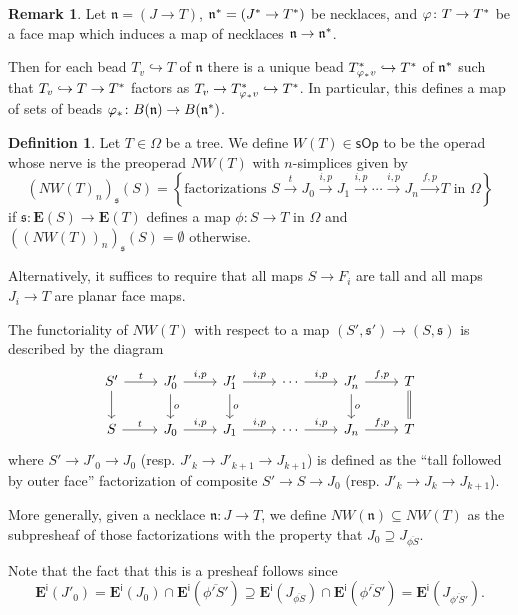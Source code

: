 \documentclass[a4paper,10pt
,draft
]{article}%
\numberwithin{equation}{section}
\numberwithin{figure}{section}
\theoremstyle{definition} %
\newtheorem{definition}[equation]{Definition}%
\newtheorem{remark}[equation]{Remark}%
\newcommand{\1}{\ensuremath{\mathbbm 1}}%
\begin{document}
\begin{remark}\label{BEADMAP REM}
	Let $\mathfrak{n} = (J \to T)$,
	$\mathfrak{n}^{\**} = (J^{\**} \to T^{\**})$
	be necklaces,
	and $\varphi \colon T \to T^{\**}$
	be a face map which induces a map of necklaces
	$\mathfrak{n} \to \mathfrak{n}^{\**}$.

	Then for each bead $T_{v} \hookrightarrow T$
	of $\mathfrak{n}$
	there is a unique bead
	$T^{\**}_{\varphi_{\**} v} \hookrightarrow T^{\**}$
	of $\mathfrak{n}^{\**}$
	such that
	$T_v \hookrightarrow T \to T^{\**}$
	factors as
	$T_v \to T^{\**}_{\varphi_{\**}v} \hookrightarrow T^{\**}$.
%	
	In particular, 
	this defines a map of sets of beads
	$\varphi_{\**} \colon 
	B(\mathfrak{n}) \to B(\mathfrak{n}^{\**})$.
\end{remark}



\begin{definition}\label{NWTNS DEF}
	Let $T \in \Omega$ be a tree.
	We define 
	$W(T) \in \mathsf{sOp}$
	to be the operad whose nerve is the preoperad
	$NW(T)$ with $n$-simplices given by
\[
	\left(NW(T)_n\right)_{\mathfrak{s}}(S)
=
	\left\{
	\text{factorizations }
	S \xrightarrow{t} 
	J_0 \xrightarrow{i,p} 
	J_1 \xrightarrow{i,p} 
	\cdots \xrightarrow{i,p}
	J_n \xrightarrow{f,p}
	T
	\text{ in $\Omega$}
	\right\}
\]
	if $\mathfrak{s} \colon \boldsymbol{E}(S) \to \boldsymbol{E}(T)$
	defines a map $\phi \colon S \to T$ in $\Omega$
	and
	$\left(\left(NW(T)\right)_n\right)_{\mathfrak{s}}(S) = \emptyset$
	otherwise.
	
	Alternatively, it suffices to require that all maps
	$S \to F_i$ are tall
	and all maps $J_i \to T$ are planar face maps.

	
	The functoriality of 
	$NW(T)$
	with respect to a map $(S', \mathfrak s') \to ({S},\mathfrak{s})$
	is described by the diagram
\[
\begin{tikzcd}
	S' \ar{r}{t} \ar{d}
&
	J'_0 \ar{r}{i,p} \ar{d}{o}
&
	J'_1 \ar{r}{i,p} \ar{d}{o}
&
	\cdots \ar{r}{i,p}
&
	J'_n \ar{r}{f,p} \ar{d}{o}
&
	T \ar[equal]{d}
\\
	S \ar{r}{t} 
&
	J_0 \ar{r}{i,p}
&
	J_1 \ar{r}{i,p}
&
	\cdots \ar{r}{i,p}
&
	J_n \ar{r}{f,p}
&
	T	
\end{tikzcd}
\]
	where 
	$S' \to J'_0 \to J_0$
	(resp. $J'_k \to J'_{k+1} \to J_{k+1}$)
	is defined as the ``tall followed by outer face''
	factorization of composite
	$S' \to S \to J_0$
	(resp. $J'_k \to J_{k} \to J_{k+1}$).

	More generally, 
	given a necklace $\mathfrak{n}\colon J \to T$,
	we define
	$NW(\mathfrak{n}) \subseteq NW(T)$
	as the subpresheaf
	of those factorizations with the property that
	$J_0 \supseteq J_{\overline{\phi S}}$.

	Note that the fact that this is a presheaf follows 
	since
\[
	\boldsymbol{E}^{\mathsf{i}}(J'_0)
=
	\boldsymbol{E}^{\mathsf{i}}(J_0)
	\cap
	\boldsymbol{E}^{\mathsf{i}}(\overline{\phi' S'})
\supseteq
	\boldsymbol{E}^{\mathsf{i}}(J_{\overline{\phi S}})
	\cap
	\boldsymbol{E}^{\mathsf{i}}(\overline{\phi' S'})
=
	\boldsymbol{E}^{\mathsf{i}}(J_{\overline{\phi' S'}}).
\]
\end{definition}
\end{document}
